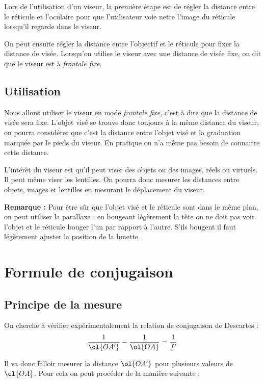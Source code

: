 \documentclass[a4paper]{tp}
\begin{document}
Lors de l'utilisation d'un viseur, la première étape est de régler la distance entre le réticule et l'oculaire pour que l'utilisateur voie nette l'image du réticule lorsqu'il regarde dans le viseur.

On peut ensuite régler la distance entre l'objectif et le réticule pour fixer la distance de visée. Lorsqu'on utilise le viseur avec une distance de visée fixe, on dit que le viseur est à \emph{frontale fixe}.  


\subsection{Utilisation}%
\label{sub:utilisation}
Nous allons utiliser le viseur en mode \emph{frontale fixe}, c'est à dire que la distance de visée sera fixe. L'objet visé se trouve donc toujours à la même distance du viseur, on pourra considérer que c'est la distance entre l'objet visé et la graduation marquée par le pieds du viseur. En pratique on n'a même pas besoin de connaitre cette distance.

L'intérêt du viseur est qu'il peut viser des objets ou des images, réels ou virtuels. Il peut même viser les lentilles. On pourra donc mesurer les distances entre objets, images et lentilles en mesurant le déplacement du viseur.

\textbf{Remarque : } Pour être sûr que l'objet visé et le réticule sont dans le même plan, on peut utiliser la parallaxe : en bougeant légèrement la tête on ne doit pas voir l'objet et le réticule bouger l'un par rapport à l'autre. S'ils bougent il faut légèrement ajuster la position de la lunette. 

\section{Formule de conjugaison}
\subsection{Principe de la mesure}%
\label{sub:principe_de_la_mesure}


On cherche à vérifier expérimentalement la relation de conjugaison de Descartes :
\begin{equation*}
  \frac{1}{\ol{OA'}}-\frac{1}{\ol{OA}} = \frac{1}{f'}
\end{equation*}

Il va donc falloir mesurer la distance $\ol{OA'}$ pour plusieurs valeurs de $\ol{OA}$. Pour cela on peut procéder de la manière suivante :
\end{document}
